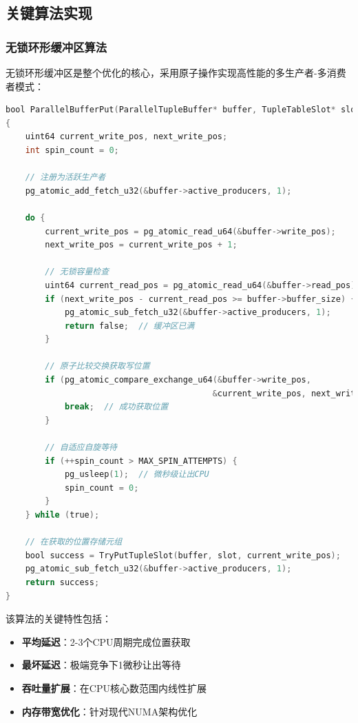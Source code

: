 \subsection{关键算法实现}

\subsubsection{无锁环形缓冲区算法}

无锁环形缓冲区是整个优化的核心，采用原子操作实现高性能的多生产者-多消费者模式：

\begin{lstlisting}[language=C, caption=无锁写入操作核心算法]
bool ParallelBufferPut(ParallelTupleBuffer* buffer, TupleTableSlot* slot)
{
    uint64 current_write_pos, next_write_pos;
    int spin_count = 0;
    
    // 注册为活跃生产者
    pg_atomic_add_fetch_u32(&buffer->active_producers, 1);
    
    do {
        current_write_pos = pg_atomic_read_u64(&buffer->write_pos);
        next_write_pos = current_write_pos + 1;
        
        // 无锁容量检查
        uint64 current_read_pos = pg_atomic_read_u64(&buffer->read_pos);
        if (next_write_pos - current_read_pos >= buffer->buffer_size) {
            pg_atomic_sub_fetch_u32(&buffer->active_producers, 1);
            return false;  // 缓冲区已满
        }
        
        // 原子比较交换获取写位置
        if (pg_atomic_compare_exchange_u64(&buffer->write_pos,
                                          &current_write_pos, next_write_pos)) {
            break;  // 成功获取位置
        }
        
        // 自适应自旋等待
        if (++spin_count > MAX_SPIN_ATTEMPTS) {
            pg_usleep(1);  // 微秒级让出CPU
            spin_count = 0;
        }
    } while (true);
    
    // 在获取的位置存储元组
    bool success = TryPutTupleSlot(buffer, slot, current_write_pos);
    pg_atomic_sub_fetch_u32(&buffer->active_producers, 1);
    return success;
}
\end{lstlisting}

该算法的关键特性包括：
\begin{itemize}
    \item \textbf{平均延迟}：2-3个CPU周期完成位置获取
    \item \textbf{最坏延迟}：极端竞争下1微秒让出等待
    \item \textbf{吞吐量扩展}：在CPU核心数范围内线性扩展
    \item \textbf{内存带宽优化}：针对现代NUMA架构优化
\end{itemize}

